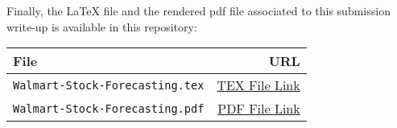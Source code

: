\documentclass{article}
\newcommand{\1}{\mathbbm{1}}
\theoremstyle{definition}
\begin{document}
Finally, the LaTeX file and the rendered pdf file associated to this submission write-up is available in this repository:

\begin{table}[H]
\centering
\begin{tabular}{l|r}
\hline
\textbf{File}  & \textbf{URL} \\
\hline
\texttt{Walmart-Stock-Forecasting.tex} & \href{https://github.com/Stochastic1017/Walmart-Stock-Forecasting/blob/main/Write-Up/Walmart-Stock-Forecasting.tex}{TEX File Link} \\
\texttt{Walmart-Stock-Forecasting.pdf} & \href{https://github.com/Stochastic1017/Walmart-Stock-Forecasting/blob/main/Write-Up/Walmart_Stock_Forecasting.pdf}{PDF File Link} \\
\hline
\end{tabular}
\end{table}
\end{document}

